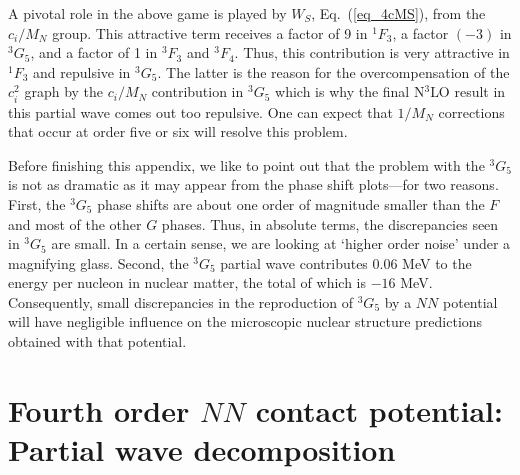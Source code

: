 \documentclass[sort&compress,preprint,3p]{elsarticle}
\begin{document}
A pivotal role in the above game is played by $W_S$, 
Eq.~(\ref{eq_4cMS}), from the $c_i/M_N$ group.
This attractive term receives a factor of 9 in $^1F_3$,
a factor $(-3)$ in $^3G_5$, and a factor of 1 in $^3F_3$
and $^3F_4$. Thus, this contribution is very attractive in
$^1F_3$ and repulsive in $^3G_5$. The latter is the reason for
the overcompensation of the $c_i^2$ graph by
the $c_i/M_N$ contribution in $^3G_5$ which is why the final
N$^3$LO result in this partial wave comes out too repulsive.
One can expect that $1/M_N$ corrections that occur at order
five or six will resolve this problem.

Before finishing this appendix, we like to point out that
the problem with the $^3G_5$ is not as dramatic as it may appear
from the phase shift plots---for two reasons.
First, the $^3G_5$ phase shifts are about one order of
magnitude smaller than the $F$ and most of the other $G$
phases. Thus, in absolute terms, the discrepancies seen
in $^3G_5$ are small.
In a certain sense, we are looking at `higher order noise'
under a magnifying glass.
Second, 
the $^3G_5$ partial wave contributes 0.06 MeV
to the energy per nucleon in nuclear matter,
the total of which is $-16$ MeV.
Consequently, small discrepancies in the reproduction
of $^3G_5$ by a $NN$ potential will have
negligible influence on the microscopic nuclear structure
predictions obtained with that potential.


\section{Fourth order $NN$ contact potential: Partial wave decomposition 
\label{app_ct}}

\setcounter{figure}{0}
\setcounter{table}{0}
\end{document}
